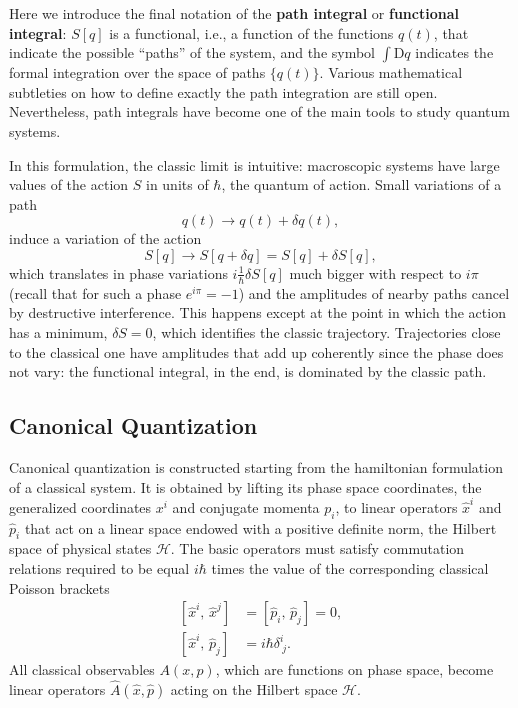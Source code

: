 Here we introduce the final notation of the \textbf{path integral} or \textbf{functional integral}: $S[q]$ is a functional, i.e., a function of the functions $q(t)$, that indicate the possible ``paths'' of the system, and the symbol $\int \mathrm{D}q$ indicates the formal integration over the space of paths $\{q(t)\}$. Various mathematical subtleties on how to define exactly the path integration are still open. Nevertheless, path integrals have become one of the main tools to study quantum systems.

In this formulation, the classic limit is intuitive: macroscopic systems have large values of the action $S$ in units of $\hbar$, the quantum of action. Small variations of a path
\[
    q(t) \to q(t) + \delta q(t),
\]
induce a variation of the action
\[
    S[q] \to S[q + \delta q] = S[q] + \delta S[q],
\]
which translates in phase variations $i\frac{1}{\hbar} \delta S[q]$ much bigger with respect to $i\pi$ (recall that for such a phase $e^{i\pi} = -1$) and the amplitudes of nearby paths cancel by destructive interference. This happens except at the point in which the action has a minimum, $\delta S = 0$, which identifies the classic trajectory. Trajectories close to the classical one have amplitudes that add up coherently since the phase does not vary: the functional integral, in the end, is dominated by the classic path.

\subsection*{Canonical Quantization}

Canonical quantization is constructed starting from the hamiltonian formulation of a classical system. It is obtained by lifting its phase space coordinates, the generalized coordinates \(x^i\) and conjugate momenta \(p_i\), to linear operators \(\hat{x}^i\) and \(\hat{p}_i\) that act on a linear space endowed with a positive definite norm, the Hilbert space of physical states \(\mathcal{H}\). The basic operators must satisfy commutation relations required to be equal \(i\hbar\) times the value of the corresponding classical Poisson brackets
\begin{equation}
    \begin{aligned}
        \left[\hat{x}^i,\, \hat{x}^j \right] & = \left[\hat{p}_i,\, \hat{p}_j \right] = 0, \\
        \left[\hat{x}^i,\, \hat{p}_j \right] & = i \hbar \delta^i_{\ j}.
    \end{aligned}
    \label{eq:Quantization_commutation_relations}
\end{equation}
All classical observables \(A(x,p)\), which are functions on phase space, become linear operators \(\hat{A} (\hat{x} ,\hat{p})\) acting on the Hilbert space \(\mathcal{H}\).

